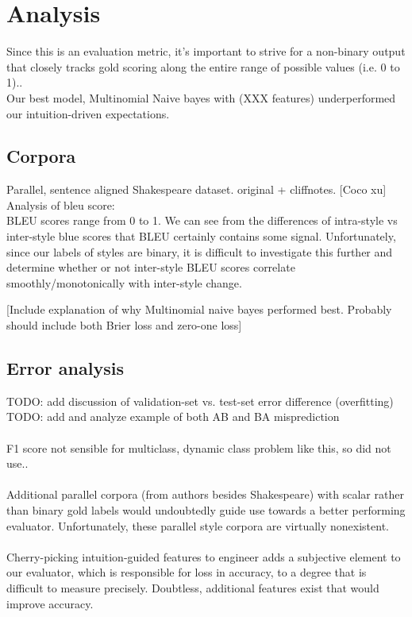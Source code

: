 \documentclass[letterpaper, 10 pt, conference]{ieeeconf}  %
\begin{document}
  \section{Analysis}
    Since this is an evaluation metric, it's important to strive for a non-binary output that closely tracks gold scoring along the entire range of possible values (i.e. 0 to 1)..\\
    Our best model, Multinomial Naive bayes with (XXX features) underperformed our intuition-driven expectations.

  \subsection{Corpora}
    Parallel, sentence aligned Shakespeare dataset. original + cliffnotes. [Coco xu] \\
    Analysis of bleu score:\\


  BLEU scores range from 0 to 1. We can see from the differences of intra-style vs inter-style blue scores that BLEU certainly contains some signal. Unfortunately, since our labels of styles are binary, it is difficult to investigate this further and determine whether or not inter-style BLEU scores correlate smoothly/monotonically with inter-style change.

  [Include explanation of why Multinomial naive bayes performed best. Probably should include both Brier loss and zero-one loss]

  \subsection{Error analysis}
      TODO: add discussion of validation-set vs. test-set error difference (overfitting)\\
      TODO: add and analyze example of both AB and BA misprediction\\ \\
      F1 score not sensible for multiclass, dynamic class problem like this, so did not use..\\ \\

      Additional parallel corpora (from authors besides Shakespeare) with scalar rather than binary gold labels would undoubtedly guide use towards a better performing evaluator. Unfortunately, these parallel style corpora are virtually nonexistent.
      \\ \\
      Cherry-picking intuition-guided features to engineer adds a subjective element to our evaluator, which is responsible for loss in accuracy, to a degree that is difficult to measure precisely. Doubtless, additional features exist that would improve accuracy.
\end{document}
